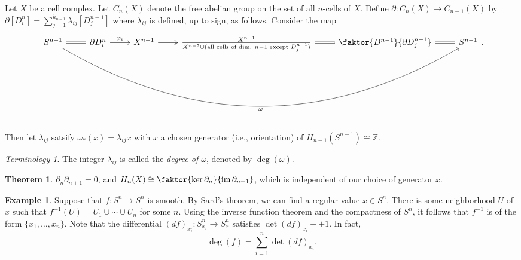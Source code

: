 \documentclass[10pt,letterpaper,cm]{nupset}
\theoremstyle{definition}
\newtheorem{exmp}[defn]{Example}
\theoremstyle{theorem}
\newtheorem{theorem}[defn]{Theorem}
\theoremstyle{remark}
\newtheorem*{term}{Terminology}
\newcommand{\Z}{\mathbb Z}
\newcommand{\1}{\mathbb{1}}
\newcommand{\0}{\vec 0}
\DeclareMathOperator{\im}{im}
\begin{document}
Let $X$ be a cell complex. Let $C_n(X)$ denote the free abelian group on the set of all $n$-cells of $X$. Define $\partial : C_n(X) \to C_{n-1}(X)$ by $\partial[D_i^n] = \sum_{j=1}^{k_{n-1}} \lambda_{ij}[D_j^{n-1}]$ where $\lambda_{ij}$ is defined, up to sign, as follows. Consider the map
\[
\begin{tikzcd}
S^{n-1} \arrow[r, equals] \arrow[rrrrr, "\omega"', bend right] & \partial{D_i^n} \arrow[r, "\varphi_i"] & X^{n-1} \arrow[r, two heads] & \frac{X^{n-1}}{X^{n-2} \cup (\text{all cells of dim. } n-1 \text{ except } D_j^{n-1})} \arrow[r, equals] & \faktor{D^{n-1}}{\partial{D_j^{n-1}}} \arrow[r, equals] & S^{n-1}
\end{tikzcd}
.\]
 Then let $\lambda_{ij}$ satsify $\omega_{\ast}(x) = \lambda_{ij}x$ with $x$ a chosen generator (i.e., orientation) of $H_{n-1}(S^{n-1}) \cong \Z$. 

\begin{term}
The integer $\lambda_{ij}$ is called the \textit{degree of $\omega$}, denoted by $\deg(\omega)$.
\end{term}

\begin{theorem}
$\partial_n{\partial_{n+1}} = 0$, and $H_n(X) \cong \faktor{\ker{\partial_n}}{\im{\partial_{n+1}}}$, which is independent of our choice of generator $x$.
\end{theorem}

\begin{exmp}
Suppose that $f: S^n \to S^n$ is smooth. By Sard's theorem, we can find a regular value $x \in S^n$. There is some neighborhood $U$ of $x$ such that $f^{-1}(U) = U_1 \cup \cdots \cup U_n$ for some $n$. Using the inverse function theorem and the compactness of $S^n$, it follows that $f^{-1}$ is of the form $\{x_1, \ldots, x_n\}$. Note that the differential $(d{f})_{x_i} : S^n_{x_i} \to S^n_x$ satisfies $\det{(d{f})_{x_i}} - \pm 1$. In fact, $$\deg(f) = \sum_{i=1}^n \det{(d{f})_{x_i}}.$$
\end{exmp}
\end{document}
